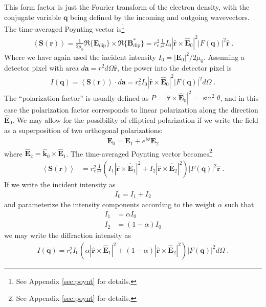 \documentclass[12pt]{article}
\renewcommand{\vec}[1]{\boldsymbol{#1}}
\newcommand{\hvec}[1]{\hat{\vec{#1}}}
\newcommand{\avg}[1]{\left\langle #1 \right\rangle}
\begin{document}
This form factor is just the Fourier transform of the electron density, with the conjugate variable $\vec{q}$ being defined by the incoming and outgoing wavevectors.  The time-averaged Poynting vector is\footnote{See Appendix \ref{sec:poynt} for details.}
\begin{align}
\avg{\vec{S}(\vec{r})} = \frac{1}{2\mu_0} \Re\{\vec{E}_\text{dip}\}\times\Re\{\vec{B}_\text{dip}^*\} = r_e^2 \frac{1}{r^2} I_0 | \hvec{r} \times  \hvec{E}_0 |^2 \left| F(\vec{q}) \right|^2 \hvec{r} \;.
\end{align}
Where we have again used the incident intensity $I_0 = |\vec{E}_0|^2/2\mu_0$.  Assuming a detector pixel with area $d\vec{a} = r^2 d\Omega \hvec{r}$, the power into the detector pixel is
\begin{align}
I(\vec{q}) = \avg{\vec{S}(\vec{r})} \cdot d\vec{a} = r_e^2 I_0 | \hvec{r} \times  \hvec{E}_0 |^2 \left| F(\vec{q}) \right|^2 d\Omega\;.
\end{align}
The ``polarization factor'' is usually defined as $P=| \hvec{r} \times  \hvec{E}_0 |^2=\sin^2\theta$, and in this case the polarization factor corresponds to linear polarization along the direction $\hvec{E}_0$.  We may allow for the possibility of
elliptical polarization if we write the field as a superposition of two orthogonal polarizations:
\begin{align}
 \vec{E}_0 = \vec{E}_1 + e^{i\phi}\vec{E}_2 
\end{align}
where $\hvec{E}_2 = \hvec{k}_0 \times \hvec{E}_1$.  The time-averaged Poynting vector becomes\footnote{See Appendix \ref{sec:poynt} for details.}
\begin{align}
\avg{\vec{S}(\vec{r})} &= r_e^2 \frac{1}{r^2} (I_1 | \hvec{r} \times  \hvec{E}_1 |^2 + I_2 | \hvec{r} \times  \hvec{E}_2 |^2) \left| F(\vec{q}) \right|^2 \hvec{r} \;. 
\end{align}
If we write the incident intensity as 
\begin{align}
 I_0 = I_1 + I_2 
\end{align}
and parameterize the intensity components according to the weight $\alpha$ such that
\begin{align}
 I_1 &=\alpha I_0\\
 I_2 &= (1-\alpha)I_0
\end{align}
we may write the diffraction intensity as
\begin{align}
I(\vec{q}) = r_e^2 I_0 (\alpha | \hvec{r} \times  \hvec{E}_1 |^2 + (1-\alpha) | \hvec{r} \times  \hvec{E}_2 |^2) \left| F(\vec{q}) \right|^2 d\Omega\;.
\end{align}
\end{document}
